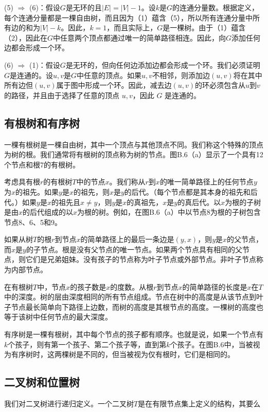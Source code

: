 \documentclass[lang=cn,newtx,10pt,scheme=chinese]{elegantbook}
\begin{document}
(5) $\Rightarrow$ (6)：假设$G$是无环的且$|E|=|V|-1$。设$k$是$G$的连通分量数。根据定义，每个连通分量都是一棵自由树，而且因为（1）蕴含（5），所以所有连通分量中所有边的和为$|V|-k$。因此，$k=1$，而且实际上，$G$是一棵树。由于（1）蕴含（2），因此在$G$中任意两个顶点都通过唯一的简单路径相连。因此，向$G$添加任何边都会形成一个环。

(6) $\Rightarrow$ (1)：假设$G$是无环的，但向任何边添加边都会形成一个环。我们必须证明$G$是连通的。设$u,v$是$G$中任意的顶点。如果$u,v$不相邻，则添加边$(u,v)$将在其中所有边但$(u,v)$属于图中形成一个环。因此，减去边$(u,v)$的环必须包含从$u$到$v$的路径，并且由于选择了任意的顶点 $u,v $，因此 $G $ 是连通的。


\subsection{有根树和有序树}

一棵有根树是一棵自由树，其中一个顶点与其他顶点不同。我们称这个特殊的顶点为树的根。我们通常将有根树的顶点称为树的节点。图B.6（a）显示了一个具有12个节点和根7的有根树。

考虑具有根$r$的有根树$T$中的节点$x$。我们称从$r$到$x$的唯一简单路径上的任何节点$y$为$x$的祖先。如果$y$是$x$的祖先，则$x$是$y$的后代。（每个节点都是其本身的祖先和后代。）如果$y$是$x$的祖先且$x \neq y$，则$y$是$x$的真祖先，$x$是$y$的真后代。以$x$为根的子树是由$x$的后代组成的以$x$为根的树。例如，在图B.6（a）中以节点8为根的子树包含节点8、6、5和9。

如果从树$T$的根$r$到节点$x$的简单路径上的最后一条边是$(y,x)$，则$y$是$x$的父节点，而$x$是$y$的子节点。根是没有父节点的唯一节点。如果两个节点具有相同的父节点，则它们是兄弟姐妹。没有孩子的节点称为叶子节点或外部节点。非叶子节点称为内部节点。

在有根树$T$中，节点$x$的孩子数是$x$的度数。从根$r$到节点$x$的简单路径的长度是$x$在$T$中的深度。树的层由深度相同的所有节点组成。节点在树中的高度是从该节点到叶子节点最长简单向下路径上边数，而树的高度是其根节点的高度。一棵树的高度也等于该树中任何节点的最大深度。

有序树是一棵有根树，其中每个节点的孩子都有顺序。也就是说，如果一个节点有$k$个孩子，则有第一个孩子、第二个孩子等，直到第$k$个孩子。在图B.6中，当被视为有序树时，这两棵树是不同的，但当被视为仅有根时，它们是相同的。

\subsection{二叉树和位置树}

我们对二叉树进行递归定义。一个二叉树$T$是在有限节点集上定义的结构，其要么
\end{document}
